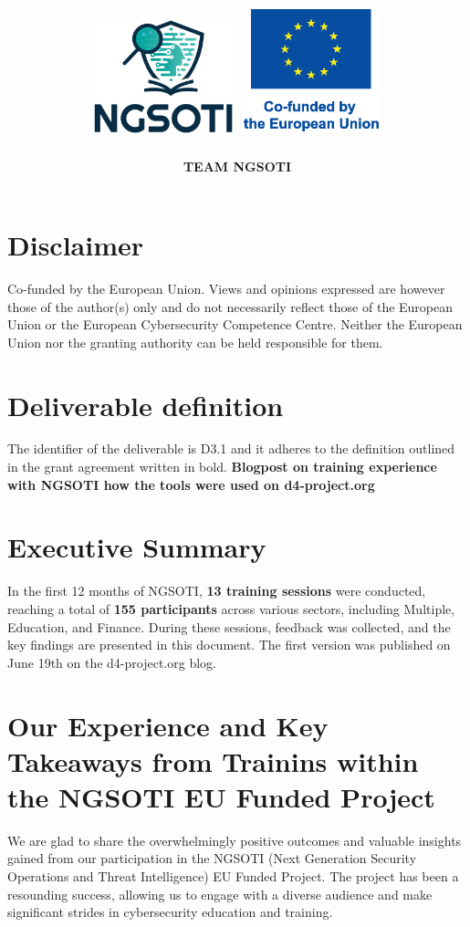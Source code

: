 \documentclass[10pt,a4paper]{report}
\title{
    \Huge \textbf{\delivtitle} \\[0.5cm]
    \includegraphics[width=0.3\textwidth]{img/ngsoti.eps}
    \hspace{1cm}
    \includegraphics[width=0.3\textwidth]{img/eu_funded_en.eps}
}
\author{\textbf{TEAM NGSOTI}}
\date{\delivdate}
\begin{document}
\maketitle
\thispagestyle{empty} %

\newpage
\tableofcontents
\newpage
\section*{Disclaimer}
Co-funded by the European Union. Views and opinions expressed are however
those of the author(s) only and do not necessarily reflect those of the
European Union or the European Cybersecurity Competence Centre. Neither
the European Union nor the granting authority can be held responsible for them.

\section*{Deliverable definition}
The identifier of the deliverable is D3.1 and it adheres to the definition
outlined in the grant agreement written in bold.
\textbf{Blogpost on training experience with NGSOTI how the tools were used on d4-project.org}

\section*{Executive Summary}
In the first 12 months of NGSOTI, \textbf{13 training sessions} were conducted, reaching
a total of \textbf{155 participants} across various sectors, including Multiple,
Education, and Finance. During these sessions, feedback was collected, and
the key findings are presented in this document. The first version was published on June 19th on the d4-project.org blog.

\section*{Our Experience and Key Takeaways from Trainins within the NGSOTI EU Funded Project}

We are glad to share the overwhelmingly positive outcomes and valuable
insights gained from our participation in the NGSOTI (Next Generation Security
Operations and Threat Intelligence) EU Funded Project. The project has been a
resounding success, allowing us to engage with a diverse audience and make
significant strides in cybersecurity education and training.
\end{document}

